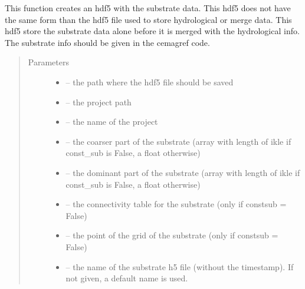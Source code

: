 \documentclass[letterpaper,10pt,english]{sphinxmanual}
\begin{document}

\begin{fulllineitems}
\label{\detokenize{index:src.load_hdf5.save_hdf5_sub}}
This function creates an hdf5 with the substrate data. This hdf5 does not have the same form than the hdf5 file used
to store hydrological or merge data. This hdf5 store the substrate data alone before it is merged with the
hydrological info. The substrate info should be given in the cemagref code.
\begin{quote}\begin{description}
\item[{Parameters}] \leavevmode\begin{itemize}
\item {} 
 -- the path where the hdf5 file should be saved

\item {} 
 -- the project path

\item {} 
 -- the name of the project

\item {} 
 -- the coarser part of the substrate (array with length of ikle if const\_sub is False, a float otherwise)

\item {} 
 -- the dominant part of the substrate (array with length of ikle if const\_sub is False, a float otherwise)

\item {} 
 -- the connectivity table for the substrate (only if constsub = False)

\item {} 
 -- the point of the grid of the substrate (only if constsub = False)

\item {} 
 -- the name of the substrate h5 file (without the timestamp). If not given, a default name is used.


\end{itemize}
\end{description}
\end{quote}
\end{fulllineitems}
\end{document}
